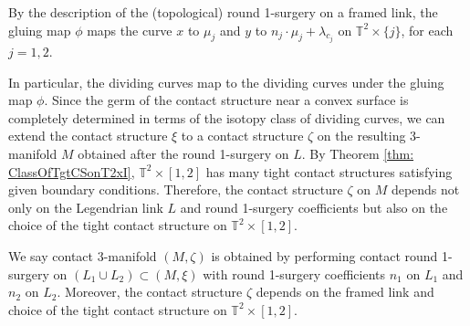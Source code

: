 \documentclass{amsart}
\theoremstyle{plain}
\theoremstyle{remark}
\theoremstyle{definition}
\begin{document}
By the description of the (topological) round 1-surgery on a framed link, the gluing map $\phi$ maps the curve $x$ to $\mu_j$ and $y$ to $n_j\cdot \mu_j+ \lambda_{c_j}$ on $\mathbb{T}^2 \times \{j\}$, for each $j=1,2$.

In particular, the dividing curves map to the dividing curves under the gluing map $\phi$. 
Since the germ of the contact structure near a convex surface is completely 
determined in terms of the isotopy class of dividing curves, we can extend the contact structure $\xi$ to a contact structure $\zeta$ on the resulting 3-manifold $M$ obtained after the round 1-surgery on $L$.
By Theorem \ref{thm: ClassOfTgtCSonT2xI}, $\mathbb{T}^2 \times [1,2]$ has many tight contact structures satisfying given boundary conditions.
Therefore, the contact structure $\zeta$ on $M$ depends not only on the Legendrian link $L$ and round 1-surgery coefficients but also on the choice of the tight contact structure on $\mathbb{T}^2 \times [1,2]$. 

We say contact 3-manifold $(M, \zeta)$ is obtained by performing contact round 1-surgery on $\left(L_1 \cup L_2\right) \subset (M, \xi)$ with round 1-surgery coefficients $n_1$ on $L_1$ and $n_2$ on $L_2$. 
Moreover, the contact structure $\zeta$ depends on the framed link and choice of the tight contact structure on $\mathbb{T}^2 \times [1,2]$. 
\end{document}
